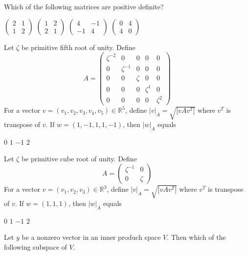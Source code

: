 \documentclass[10pt]{exam}
\newcommand{\R}{\ensuremath{\mathbb{R}}}
\begin{document}
\begin{questions}
\question
Which of the following matrices are positive definite?

\begin{oneparcheckboxes}
\choice $\begin{pmatrix}2 & 1 \\ 1 & 2\end{pmatrix} $
\choice $\begin{pmatrix}1 & 2 \\ 2 & 1\end{pmatrix} $
\choice $\begin{pmatrix}4 & -1 \\ -1 & 4\end{pmatrix} $
\choice $\begin{pmatrix}0 & 4 \\ 4 & 0\end{pmatrix} $
\end{oneparcheckboxes}


\question
Let $\zeta$ be primitive fifth root of unity. Define
$$A=\begin{pmatrix}
\zeta^{-2} & 0 & 0 & 0 & 0 \\ 
0 & \zeta^{-1} & 0 & 0 & 0 \\ 
0 & 0 & \zeta & 0 & 0 \\ 
0 & 0 & 0 & \zeta^{1} & 0 \\ 
0 & 0 & 0 & 0 & \zeta^{2}
\end{pmatrix} $$
For a vector $v=(v_1,v_2,v_3, v_4, v_5) \in \R^5$, define $|v|_A=\sqrt{|vAv^T|}$ where $v^T$ is transpose of $v$. If $w=(1,-1,1,
1,-1)$, then $|w|_A$ equals

\begin{oneparchoices}
\choice $0$
\choice $1$
\choice $-1$
\choice $2$
\end{oneparchoices}

\question
Let $\zeta$ be primitive cube root of unity. Define
$$A=\begin{pmatrix}
\zeta^{-1} & 0 \\ 
0 & \zeta 
\end{pmatrix} $$
For a vector $v=(v_1,v_2,v_3) \in \R^3$, define $|v|_A=\sqrt{|vAv^T|}$ where $v^T$ is transpose of $v$. If $w=(1,1, 1)$, then
$|w|_A$ equals

\begin{oneparchoices}
\choice $0$
\choice $1$
\choice $-1$
\choice $2$
\end{oneparchoices}

\question
Let $y$ be a nonzero vector in an inner produch space $V$. Then which of the following subspace of $V$.


\end{questions}
\end{document}
